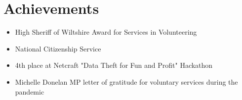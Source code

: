 \section*{Achievements}
\begin{itemize}
    \item High Sheriff of Wiltshire Award for Services in Volunteering
    \item National Citizenship Service
    \item 4th place at Netcraft "Data Theft for Fun and Profit" Hackathon
    \item Michelle Donelan MP letter of gratitude for voluntary services during the pandemic
\end{itemize}
